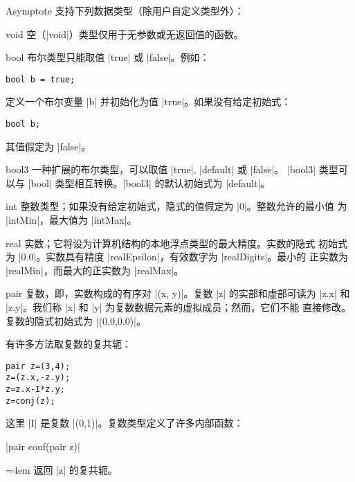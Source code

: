 \documentclass[nofonts,CJKnormalspaces]{ctexbook}[2009/05/20]
\makeatletter
\newenvironment{funclist}{\trivlist
  \parindent=0pt
\item[]
  \def\item{\medskip\par\leftskip=0pt}
  \def\go{\par\leftskip=4em}}
{\endtrivlist}
\newenvironment{typelist}{\itemize
  \let\old@item\@item
  \def\@item[##1]{\expandafter\old@item[\ttfamily\color{type!50!black}##1]}}
{\enditemize}
\newcommand*\prgname[1]{\textsf{#1}}
\makeatother
\begin{document}
\prgname{Asymptote} 支持下列数据类型（除用户自定义类型外）：
\begin{typelist}

\item[void] 空（|void|）类型仅用于无参数或无返回值的函数。

\item[bool] 布尔类型只能取值 |true| 或 |false|。例如：
\begin{lstlisting}
bool b = true;
\end{lstlisting}
定义一个布尔变量 |b| 并初始化为值 |true|。如果没有给定初始式：
\begin{lstlisting}
bool b;
\end{lstlisting}
其值假定为 |false|。

\item[bool3] 一种扩展的布尔类型，可以取值 |true|, |default| 或 |false|。
|bool3| 类型可以与 |bool| 类型相互转换。|bool3| 的默认初始式为 |default|。

\item[int] 整数类型；如果没有给定初始式，隐式的值假定为 |0|。整数允许的最小值
为 |intMin|，最大值为 |intMax|。

\item[real] 实数；它将设为计算机结构的本地浮点类型的最大精度。实数的隐式
初始式为 |0.0|。实数具有精度 |realEpsilon|，有效数字为 |realDigits|。最小的
正实数为 |realMin|，而最大的正实数为 |realMax|。

\item[pair] 复数，即，实数构成的有序对 |(x, y)|。复数 |z| 的实部和虚部可读为
|z.x| 和 |z.y|。我们称 |x| 和 |y| 为复数数据元素的虚拟成员；然而，它们不能
直接修改。复数的隐式初始式为 |(0.0,0.0)|。

有许多方法取复数的复共轭：
\begin{lstlisting}
pair z=(3,4);
z=(z.x,-z.y);
z=z.x-I*z.y;
z=conj(z);
\end{lstlisting}
这里 |I| 是复数 |(0,1)|。复数类型定义了许多内部函数：
\begin{funclist}
\item |pair conf(pair z)| \go
  返回 |z| 的复共轭。


\end{funclist}
\end{typelist}
\end{document}
